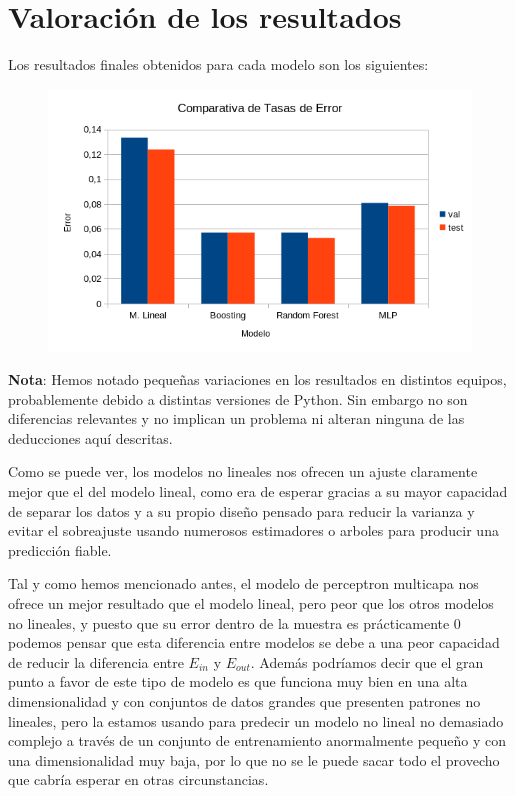 \documentclass{article}
\begin{document}
	\section{Valoración de los resultados} %
	Los resultados finales obtenidos para cada modelo son los siguientes:
	\begin{figure}[H]
	  \includegraphics[width=\linewidth]{Imagenes/CE.png}
	  \label{fig:boat1}
	\end{figure}
	\textbf{Nota}: Hemos notado pequeñas variaciones en los resultados en distintos equipos, probablemente debido a distintas versiones de Python. Sin embargo no son diferencias relevantes y no implican un problema ni alteran ninguna de las deducciones aquí descritas.
	\par
	Como se puede ver, los modelos no lineales nos ofrecen un ajuste claramente mejor que el del modelo lineal, como era de esperar gracias a su mayor capacidad de separar los datos y a su propio diseño pensado para reducir la varianza y evitar el sobreajuste usando numerosos estimadores o arboles para producir una predicción fiable. 
	\par
	Tal y como hemos mencionado antes, el modelo de perceptron multicapa nos ofrece un mejor resultado que el modelo lineal, pero peor que los otros modelos no lineales, y puesto que su error dentro de la muestra es prácticamente 0 podemos pensar que esta diferencia entre modelos se debe a una peor capacidad de reducir la diferencia entre $E_{in}$ y $E_{out}$. Además podríamos decir que el gran punto a favor de este tipo de modelo es que funciona muy bien en una alta dimensionalidad y con conjuntos de datos grandes que presenten patrones no lineales, pero la estamos usando para predecir un modelo no lineal no demasiado complejo a través de un conjunto de entrenamiento anormalmente pequeño y con una dimensionalidad muy baja, por lo que no se le puede sacar todo el provecho que cabría esperar en otras circunstancias.
\end{document}
